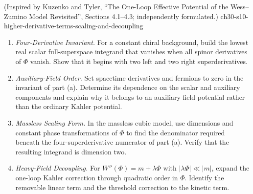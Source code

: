 \begin{enumerate}
    {(Inspired by Kuzenko and Tyler, ``The One-Loop Effective Potential of the Wess--Zumino Model Revisited'', Sections 4.1--4.3; independently formulated.)}
    {ch30-s10-higher-derivative-terms-scaling-and-decoupling}
  \begin{enumerate}
    \item \emph{Four-Derivative Invariant.}
    For a constant chiral background, build the lowest real scalar
      full-superspace integrand that vanishes when all spinor derivatives
      of \(\Phi\) vanish.  Show that it begins with two left and two right
      superderivatives.
    \item \emph{Auxiliary-Field Order.}
    Set spacetime derivatives and fermions to zero in the invariant of
      part (a).  Determine its dependence on the scalar and
      auxiliary components and explain why it belongs to an auxiliary
      field potential rather than the ordinary Kahler potential.
    \item \emph{Massless Scaling Form.}
    In the massless cubic model, use dimensions and constant phase
      transformations of \(\Phi\) to find the denominator required beneath
      the four-superderivative numerator of part (a).  Verify that
      the resulting integrand is dimension two.
    \item \emph{Heavy-Field Decoupling.}
    For \(W''(\Phi)=m+\lambda\Phi\) with
      \(|\lambda\Phi|\ll |m|\), expand the one-loop Kahler correction
      through quadratic order in \(\Phi\).  Identify the removable linear
      term and the threshold correction to the kinetic term.
  \end{enumerate}

\end{enumerate}
